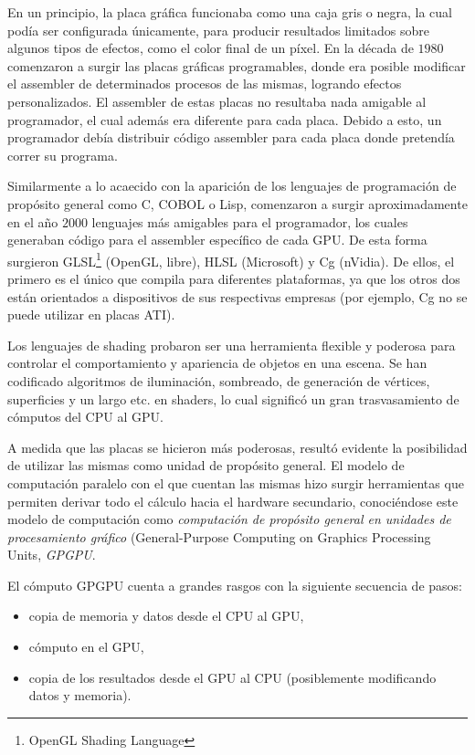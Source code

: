 En un principio, la placa gráfica funcionaba como una caja gris o negra, la cual podía ser configurada únicamente, para producir resultados limitados sobre algunos tipos de efectos, como el color final de un píxel.
En la década de $1980$ comenzaron a surgir las placas gráficas programables, donde era posible modificar el assembler de determinados procesos de las mismas, logrando efectos personalizados.
El assembler de estas placas no resultaba nada amigable al programador, el cual además era diferente para cada placa.
Debido a esto, un programador debía distribuir código assembler para cada placa donde pretendía correr su programa.

Similarmente a lo acaecido con la aparición de los lenguajes de programación de propósito general como C, COBOL o Lisp, comenzaron a surgir aproximadamente en el año $2000$ lenguajes más amigables para el programador, los cuales generaban código para el assembler específico de cada GPU.
De esta forma surgieron GLSL\footnote{OpenGL Shading Language} (OpenGL, libre), HLSL (Microsoft) y Cg (nVidia).
De ellos, el primero es el único que compila para diferentes plataformas, ya que los otros dos están orientados a dispositivos de sus respectivas empresas (por ejemplo, Cg no se puede utilizar en placas ATI).

Los lenguajes de shading probaron ser una herramienta flexible y poderosa para controlar el comportamiento y apariencia de objetos en una escena.
Se han codificado algoritmos de iluminación, sombreado, de generación de vértices, superficies y un largo etc. en shaders, lo cual significó un gran trasvasamiento de cómputos del CPU al GPU.

A medida que las placas se hicieron más poderosas, resultó evidente la posibilidad de utilizar las mismas como unidad de propósito general.
El modelo de computación paralelo con el que cuentan las mismas hizo surgir herramientas que permiten derivar todo el cálculo hacia el hardware secundario, conoci\'endose este modelo de computaci\'on como {\em computación de propósito general en unidades de procesamiento gráfico} (General-Purpose Computing on Graphics Processing Units, {\em \acrshort{GPGPU}}.

El cómputo GPGPU cuenta a grandes rasgos con la siguiente secuencia de pasos: 

\begin{itemize}
\item copia de memoria y datos desde el CPU al GPU,
\item cómputo en el GPU, 
\item copia de los resultados desde el GPU al CPU (posiblemente modificando datos y memoria).
\end{itemize}

